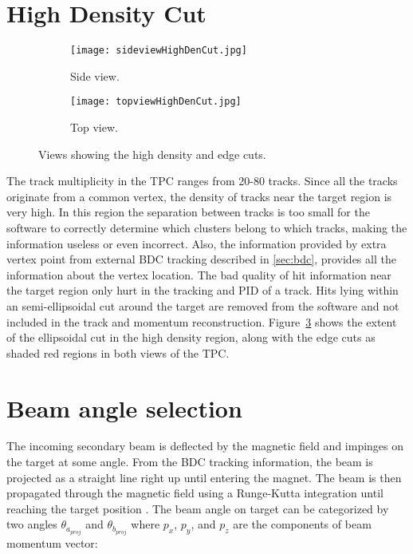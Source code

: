 \section{High Density Cut}


\begin{figure}[!htb]

     \centering
     \begin{subfigure}[b]{0.49\textwidth}
         \centering
         \texttt{[image: sideviewHighDenCut.jpg]}
         \caption{Side view.}
         \label{fig:sideHigh}
     \end{subfigure}
     \hfill
     \begin{subfigure}[b]{0.49\textwidth}
         \centering
         \texttt{[image: topviewHighDenCut.jpg]}
         \caption{Top view.}
         \label{fig:topHigh}
     \end{subfigure}
        \label{fig:highcut}
        \caption{Views showing the high density and edge cuts.}
        \label{fig:elipsecut}
\end{figure}

The track multiplicity in the TPC ranges from 20-80 tracks. Since all the tracks originate from a common vertex, the density of tracks near the target region is very high. In this region the separation between tracks is too small for the software to correctly determine which clusters belong to which tracks, making the information useless or even incorrect. Also, the information provided by extra vertex point from external BDC tracking described in \ref{sec:bdc}, provides all the information about the vertex location. The bad quality of hit information near the target region only hurt in the tracking and PID of a track. Hits lying within an semi-ellipsoidal cut around the target are removed from the software and not included in the track and momentum reconstruction. Figure~\ref{fig:elipsecut} shows the extent of the ellipsoidal cut in the high density region, along with the edge cuts as shaded red regions in both views of the TPC. 

\section{Beam angle selection}
\label{sec:beamangle}
The incoming secondary beam is deflected by the magnetic field and impinges on the target at some angle. From the BDC tracking information, the beam is projected as a straight line right up until entering the magnet.  The beam is then propagated through the magnetic field using a Runge-Kutta integration until reaching the target position \cite{jon}. The beam angle on target can be categorized by two angles $\theta_{a_{proj}}$ and $\theta_{b_{proj}}$ where $p_x$, $p_y$, and $p_z$ are the components of beam momentum vector:

